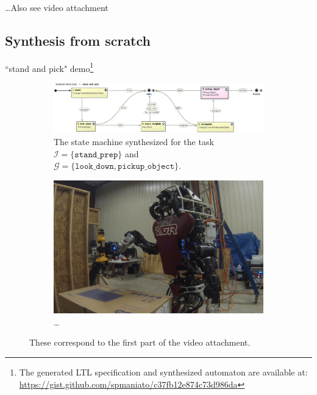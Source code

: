 
\ldots Also see video attachment


\subsection{Synthesis from scratch}

``stand and pick" demo\footnote{The generated LTL specification and synthesized automaton are available at: \scriptsize{\url{https://gist.github.com/spmaniato/c37fb12e874c73d986da}}}

\begin{figure}[t]
	\centering
	\begin{subfigure}[b]{0.99\columnwidth}
	\includegraphics[width=0.99\columnwidth,clip]{./img/stand_and_pick_sm.png}
	\caption{The state machine synthesized for the task $\mathcal{I} = \{ \mathtt{stand\_prep} \}$ and $\mathcal{G} = \{ \mathtt{look\_down}, \mathtt{pickup\_object} \}$.
	}
	\label{Fig:stand_and_pick_sm}
	\end{subfigure}
	
	\vspace{4 pt}
	\begin{subfigure}[b]{0.95\columnwidth}
	\includegraphics[width=0.99\columnwidth, clip]{./img/stand_and_pick_gopro.png}
	\caption{\ldots
	} 
	\label{Fig:runtime2}
	\end{subfigure}
	\caption{These correspond to the first part of the video attachment.
	}
	\label{Fig:stand_and_pick_demo}
\end{figure}


